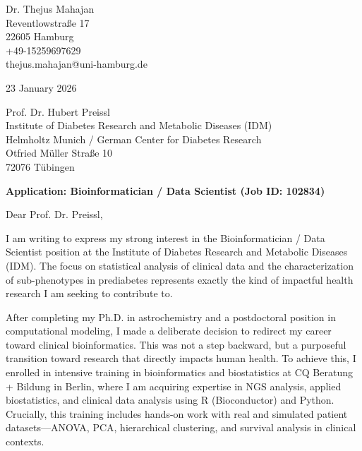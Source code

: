 \documentclass[a4paper]{article}
\begin{document}
\pagestyle{empty}
\fontsize{11}{14}
\selectfont

\begin{flushleft}
Dr. Thejus Mahajan\\
Reventlowstra{\ss}e 17\\
22605 Hamburg\\
+49-15259697629\\
thejus.mahajan@uni-hamburg.de
\end{flushleft}

\vspace{0.3cm}

\begin{flushleft}
23 January 2026
\end{flushleft}

\vspace{0.3cm}

\begin{flushleft}
Prof. Dr. Hubert Preissl\\
Institute of Diabetes Research and Metabolic Diseases (IDM)\\
Helmholtz Munich / German Center for Diabetes Research\\
Otfried M\"uller Stra{\ss}e 10\\
72076 T\"ubingen
\end{flushleft}

\vspace{0.3cm}

\textbf{Application: Bioinformatician / Data Scientist (Job ID: 102834)}

\vspace{0.5cm}

Dear Prof. Dr. Preissl,

I am writing to express my strong interest in the Bioinformatician / Data Scientist position at the Institute of Diabetes Research and Metabolic Diseases (IDM). The focus on statistical analysis of clinical data and the characterization of sub-phenotypes in prediabetes represents exactly the kind of impactful health research I am seeking to contribute to.

After completing my Ph.D. in astrochemistry and a postdoctoral position in computational modeling, I made a deliberate decision to redirect my career toward clinical bioinformatics. This was not a step backward, but a purposeful transition toward research that directly impacts human health. To achieve this, I enrolled in intensive training in bioinformatics and biostatistics at CQ Beratung + Bildung in Berlin, where I am acquiring expertise in NGS analysis, applied biostatistics, and clinical data analysis using R (Bioconductor) and Python. Crucially, this training includes hands-on work with real and simulated patient datasets---ANOVA, PCA, hierarchical clustering, and survival analysis in clinical contexts.
\end{document}
